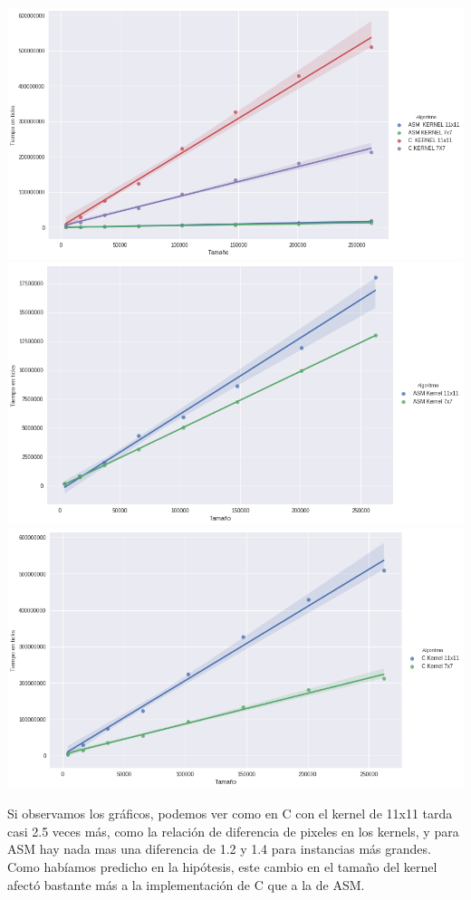 \begin{center} 
	\includegraphics[scale=0.5]{img/maxCloser_KERNEL.png}
	\includegraphics[scale=0.5]{img/maxCloser_KERNEL_ASM.png}
	\includegraphics[scale=0.5]{img/maxCloser_KERNEL_C.png}
\end{center}

Si observamos los gráficos, podemos ver como en C con el kernel de 11x11 tarda casi 2.5 veces más, como la relación de diferencia de pixeles en los kernels, y para ASM hay nada mas una diferencia de 1.2 y 1.4 para instancias más grandes. Como habíamos predicho en la hipótesis, este cambio en el tamaño del kernel afectó bastante más a la implementación de C que a la de ASM.

